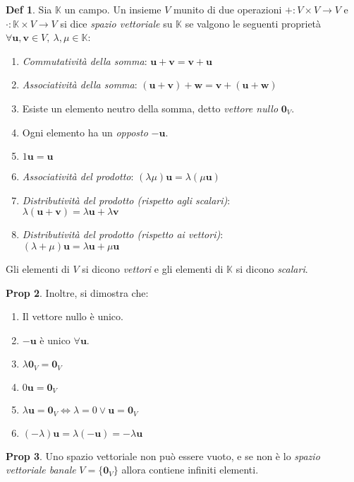 \documentclass[]{article}
\newcommand{\bl}[1]{\mathbf{#1}}
\newcommand{\vu}{\mathbf{u}}
\newcommand{\vv}{\mathbf{v}}
\theoremstyle{definition}
\theoremstyle{definition}
\newtheorem{prop}{Prop}[subsection]
\theoremstyle{definition}
\newtheorem{dfn}[prop]{Def}
\begin{document}
 \begin{dfn} Sia $\mathbb{K}$ un campo. Un insieme $V$ munito di due operazioni $+:V \times V \to V$ e $\cdot : \mathbb{K} \times V \to V$ si dice \emph{spazio vettoriale} su $\mathbb{K}$ se valgono le seguenti proprietà $\forall \vu , \vv \in V , \ \lambda , \mu \in \mathbb{K}$:
\begin{enumerate}
	\item \emph{Commutatività della somma}: $\vu + \vv = \vv + \vu$ 
	\item \emph{Associatività della somma}: $(\vu + \vv) + \bl{w} = \vv + (\vu + \bl{w})$ 
	\item Esiste un elemento neutro della somma, detto \emph{vettore nullo} $\bl{0}_V$.
	\item Ogni elemento ha un \emph{opposto} $\bl{-u}$.
	\item $1 \vu= \vu$
	\item \emph{Associatività del prodotto}: $(\lambda \mu) \vu = \lambda (\mu \vu)$
	\item \emph{Distributività del prodotto (rispetto agli scalari)}: \\ $\lambda (\vu + \vv)  = \lambda \vu + \lambda \vv $ 
	\item \emph{Distributività del prodotto (rispetto ai vettori)}: \\ $(\lambda + \mu) \vu = \lambda \vu + \mu \vu $ 
\end{enumerate}
Gli elementi di $V$ si dicono \emph{vettori} e gli elementi di $\mathbb{K}$ si dicono \emph{scalari}.

 \end{dfn} \begin{prop} Inoltre, si dimostra che:
\begin{enumerate}
	\item Il vettore nullo è unico.
	\item $\bl{-u}$ è unico $\forall \vu$.
	\item $\lambda \bl{0}_V = \bl{0}_V$
	\item $0 \vu = \bl{0}_V$
	\item$\lambda \vu = \bl{0}_V \Leftrightarrow \lambda = 0 \vee \vu = \bl{0}_V$
	\item $(- \lambda) \vu = \lambda (\bl{-u}) = - \lambda \vu$
\end{enumerate}

\end{prop} \begin{prop} Uno spazio vettoriale non può essere vuoto, e se non è lo \emph{spazio vettoriale banale} $V=\{\bl{0}_V\}$ allora contiene infiniti elementi.
\end{prop}
\end{document}
